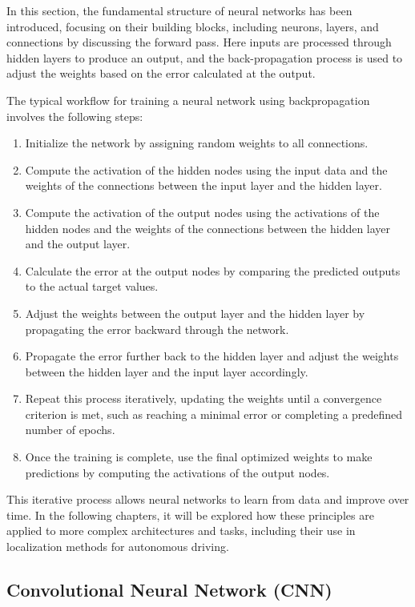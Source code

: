 In this section, the fundamental structure of neural networks has been introduced, focusing on their building blocks, including neurons, layers, and connections by discussing the forward pass. Here inputs are processed through hidden layers to produce an output, and the back-propagation process is used to adjust the weights based on the error calculated at the output.

The typical workflow for training a neural network using backpropagation \cite{10.11648/j.ajnna.20190501.12} involves the following steps:

\begin{enumerate} 
    \item Initialize the network by assigning random weights to all connections. 
    \item Compute the activation of the hidden nodes using the input data and the weights of the connections between the input layer and the hidden layer.
    \item Compute the activation of the output nodes using the activations of the hidden nodes and the weights of the connections between the hidden layer and the output layer.
    \item Calculate the error at the output nodes by comparing the predicted outputs to the actual target values.
    \item Adjust the weights between the output layer and the hidden layer by propagating the error backward through the network.
    \item Propagate the error further back to the hidden layer and adjust the weights between the hidden layer and the input layer accordingly.
    \item Repeat this process iteratively, updating the weights until a convergence criterion is met, such as reaching a minimal error or completing a predefined number of epochs.
    \item Once the training is complete, use the final optimized weights to make predictions by computing the activations of the output nodes.
\end{enumerate}

This iterative process allows neural networks to learn from data and improve over time. In the following chapters, it will be explored how these principles are applied to more complex architectures and tasks, including their use in localization methods for autonomous driving.

\subsection{Convolutional Neural Network (CNN)}

